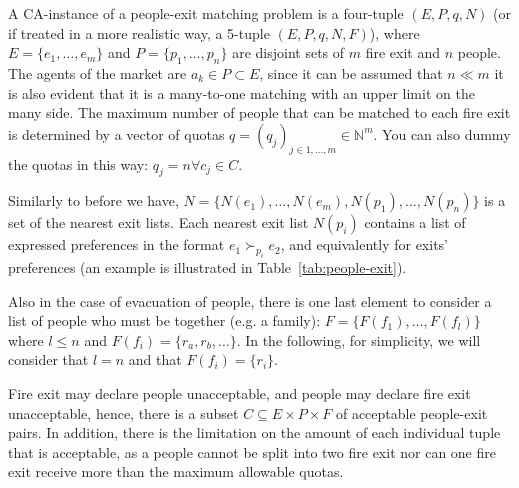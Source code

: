 \documentclass[letterpaper]{article} %
\begin{document}
    A CA-instance of a people-exit matching problem is a four-tuple \((E, P, q, N)\)
    (or if treated in a more realistic way, a 5-tuple \((E, P, q, N, F)\)), where
    \(E = \{e_1, \dots, e_m\}\) and \(P = \{p_1, \dots,p_n\}\) are disjoint sets of \(m\) fire exit and \(n\) people.
    The agents of the market are \(a_k \in P\subset E\), since it can be assumed that \(n \ll m\) it is also evident
    that it is a many-to-one matching with an upper limit  on the many side.
    The maximum number of people that can be matched to
    each fire exit is determined by a vector of quotas \(q = (q_j)_{j\in {1,...,m}} \in \mathbb{N}^m\).
    You can also dummy the quotas in this way:  \(q_j = n \forall c_j \in C\).

    Similarly to before we have, \(N = \{N(e_1), \dots , N(e_m), N(p_1), \dots , N(p_n)\}\) is
    a set of the nearest exit lists.
    Each nearest exit list \(N(p_i)\) contains a list of expressed preferences in the format
    \( e _ { 1 } \succ_{p _ { i }} e _ { 2 } \), and equivalently for exits' preferences (an example is illustrated in
    Table~\ref{tab:people-exit}).

    Also in the case of evacuation of people, there is one last element to consider a list of people who must be
    together (e.g. a family): \(F=\{F(f_1), \dots, F(f_l)\}\) where \(l\leq n\) and \(F(f_i) = \{r_a, r_b, \dots\}\).
    In the following, for simplicity, we will consider that \(l=n\) and that \(F(f_i)=\{r_i\}\).

    Fire exit may declare people unacceptable, and people may declare fire exit unacceptable,
    hence, there is a subset \(C \subseteq E \times P \times F\) of acceptable people-exit pairs.
    In addition, there is the limitation on the amount of each individual tuple that is acceptable, as a people
    cannot be split into two fire exit nor can one fire exit receive more than the maximum allowable quotas.
\end{document}
